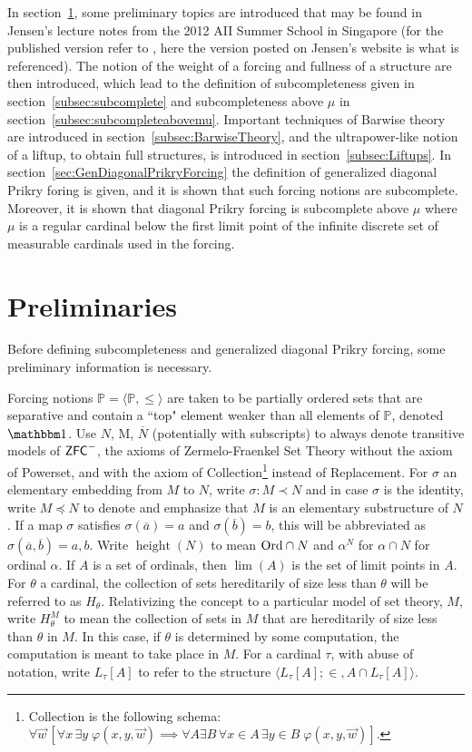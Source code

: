 \documentclass{amsart}
\theoremstyle{definition}
\theoremstyle{remark}
\renewcommand{\P}{\mathbb{P}}
\newcommand{\N}{{\overline{N}}}
\newcommand{\ZFC}{\textup{\ensuremath{\textsf{ZFC}}}}
\newcommand{\Ord}{\textup{\ensuremath{\text{Ord}}}}
\DeclareMathOperator{\height}{height}
\begin{document}
In section~\ref{sec:preliminaries}, some preliminary topics are introduced that may be found in Jensen's lecture notes from the 2012 AII Summer School in Singapore (for the published version refer to \cite{Jensen:2014}, here the version posted on Jensen's website is what is referenced). The notion of the weight of a forcing and fullness of a structure are then introduced, which lead to the definition of subcompleteness given in section~\ref{subsec:subcomplete} and subcompleteness above $\mu$ in section~\ref{subsec:subcompleteabovemu}. Important techniques of Barwise theory are introduced in section~\ref{subsec:BarwiseTheory}, and the ultrapower-like notion of a liftup, to obtain full structures, is introduced in section~\ref{subsec:Liftups}. In section~\ref{sec:GenDiagonalPrikryForcing} the definition of generalized diagonal Prikry foring is given, and it is shown that such forcing notions are subcomplete. Moreover, it is shown that diagonal Prikry forcing is subcomplete above $\mu$ where $\mu$ is a regular cardinal below the first limit point of the infinite discrete set of measurable cardinals used in the forcing.

\section{Preliminaries} \label{sec:preliminaries}
Before defining subcompleteness and generalized diagonal Prikry forcing, some preliminary information is necessary.

Forcing notions $\P = \langle \P, \leq \rangle$ are taken to be partially ordered sets that are separative and contain a ``top" element weaker than all elements of $\P$, denoted $\mathbbm 1$.
Use $N$, M, $\N$ (potentially with subscripts) to always denote transitive models of $\ZFC^-$, the axioms of Zermelo-Fraenkel Set Theory without the axiom of \textsf{Powerset}, and with the axiom of \textsf{Collection}\footnote{ \textsf{Collection} is the following schema: $\forall \vec{w}\, [\forall x \, \exists y \; \varphi(x, y, \vec{w}) \implies \forall A \exists B \, \forall x \in A \,\exists y \in B \; \varphi(x, y, \vec w) ]$.} instead of \textsf{Replacement}. For $\sigma$ an elementary embedding from $M$ to $N$, write $\sigma: M \prec N$ and in case $\sigma$ is the identity, write $M \preccurlyeq N$ to denote and emphasize that $M$ is an elementary substructure of $N$. 
If a map $\sigma$ satisfies $\sigma(\overline a)=a$ and $\sigma(\overline b)=b$, this will be abbreviated as $\sigma(\overline a,\overline b)=a,b$.
Write $\height(N)$ to mean $\Ord \cap N$ and $\alpha^N$ for $\alpha \cap N$ for ordinal $\alpha$.
If $A$ is a set of ordinals, then $\lim(A)$ is the set of limit points in $A$.  
For $\theta$ a cardinal, the collection of sets hereditarily of size less than $\theta$ will be referred to as $H_\theta$. Relativizing the concept to a particular model of set theory, $M$, write $H_\theta^M$ to mean the collection of sets in $M$ that are hereditarily of size less than $\theta$ in $M$. In this case, if $\theta$ is determined by some computation, the computation is meant to take place in $M$.
For a cardinal $\tau$, with abuse of notation, write $L_\tau[A]$ to refer to the structure $\langle L_\tau[A]; \in, A \cap L_\tau[A] \rangle$. 
\end{document}
